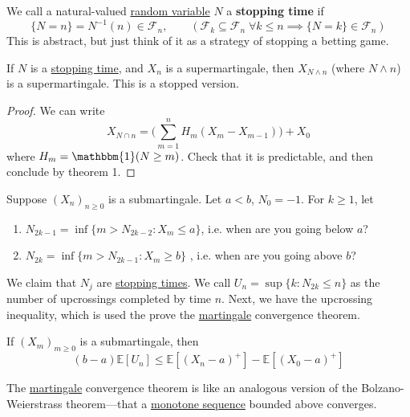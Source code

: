 	\begin{definition}
	  \label{def:stopping-time}
	  We call a natural-valued \hyperref[def:random-variable]{random variable} $N$ a \textbf{stopping time} if 
		\begin{equation}
			\{N = n\} = N^{-1} (n) \in \mathscr{F}_n, \qquad ( \mathscr{F}_k \subseteq \mathscr{F}_n \; \forall k \leq n \implies \{N = k\} \in \mathscr{F}_n )
		\end{equation}
		This is abstract, but just think of it as a strategy of stopping a betting game. 
	\end{definition}

	\begin{theorem}
	  \label{thm:stopped-supermartingales}
		If $N$ is a \hyperref[def:stopping-time]{stopping time}, and $X_n$ is a supermartingale, then $X_{N \wedge n}$ (where $N \wedge n$) is a supermartingale. This is a stopped version. 
	\end{theorem}
	\begin{proof}
	  We can write 
		\begin{equation}
			X_{N \cap n} = \bigg( \sum_{m=1}^n H_m (X_m - X_{m-1}) \bigg) + X_0
		\end{equation}
		where $H_m = \mathbbm{1}(N \geq m)$. Check that it is predictable, and then conclude by theorem 1. 
	\end{proof}

	\begin{example}
	  \label{ex:upcrossing-times-of-a-submartingale}
		Suppose $(X_n)_{n \geq 0}$ is a submartingale. Let $a < b$, $N_0 = -1$. For $k \geq 1$, let 
		\begin{enumerate}
			\item $N_{2k-1} = \inf\{m > N_{2k-2} \colon X_m \leq a \}$, i.e. when are you going below $a$? 
			\item $N_{2k} = \inf \{m > N_{2k-1} \colon X_m \geq b \}$ , i.e. when are you going above $b$? 
		\end{enumerate}
		We claim that $N_j$ are \hyperref[def:stopping-time]{stopping times}. We call $U_n = \sup \{k \colon N_{2k} \leq n\}$ as the number of upcrossings completed by time $n$. Next, we have the upcrossing inequality, which is used the prove the \hyperref[def:martingale]{martingale} convergence theorem.  
	\end{example}

	\begin{theorem}
	  \label{thm:upcrossing-inequality}
		If $(X_m)_{m \geq 0}$ is a submartingale, then 
		\begin{equation}
			(b - a) \mathbb{E}[U_n] \leq \mathbb{E}[(X_n - a)^+] - \mathbb{E}[(X_0 - a)^+]
		\end{equation}
	\end{theorem}

	The \hyperref[def:martingale]{martingale} convergence theorem is like an analogous version of the Bolzano-Weierstrass theorem---that a \hyperref[st-def:monotone-sequence]{monotone sequence} bounded above converges. 

